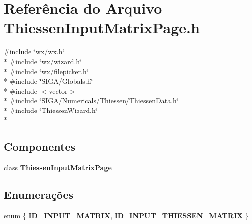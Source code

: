 \section{Referência do Arquivo Thiessen\+Input\+Matrix\+Page.\+h}
\label{_thiessen_input_matrix_page_8h}
{\ttfamily \#include \char`\"{}wx/wx.\+h\char`\"{}}\\*
{\ttfamily \#include \char`\"{}wx/wizard.\+h\char`\"{}}\\*
{\ttfamily \#include \char`\"{}wx/filepicker.\+h\char`\"{}}\\*
{\ttfamily \#include \char`\"{}S\+I\+G\+A/\+Globals.\+h\char`\"{}}\\*
{\ttfamily \#include $<$vector$>$}\\*
{\ttfamily \#include \char`\"{}S\+I\+G\+A/\+Numericals/\+Thiessen/\+Thiessen\+Data.\+h\char`\"{}}\\*
{\ttfamily \#include \char`\"{}Thiessen\+Wizard.\+h\char`\"{}}\\*
\subsection*{Componentes}
\begin{DoxyCompactItemize}
\item 
class {\bf Thiessen\+Input\+Matrix\+Page}
\end{DoxyCompactItemize}
\subsection*{Enumerações}
\begin{DoxyCompactItemize}
\item 
enum \{ {\bf I\+D\+\_\+\+I\+N\+P\+U\+T\+\_\+\+M\+A\+T\+R\+IX}, 
{\bf I\+D\+\_\+\+I\+N\+P\+U\+T\+\_\+\+T\+H\+I\+E\+S\+S\+E\+N\+\_\+\+M\+A\+T\+R\+IX}
 \}
\end{DoxyCompactItemize}
